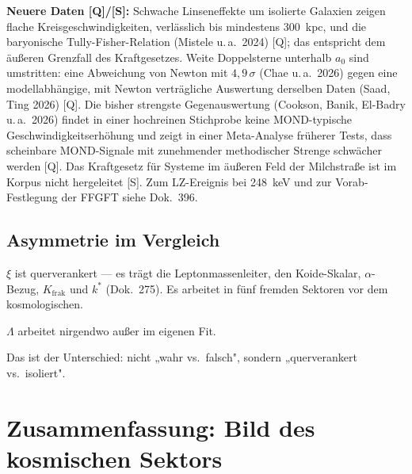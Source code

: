 \textbf{Neuere Daten [Q]/[S]:} Schwache Linseneffekte um isolierte Galaxien
zeigen flache Kreisgeschwindigkeiten, verlässlich bis mindestens 300~kpc,
und die baryonische Tully-Fisher-Relation (Mistele u.\,a.\ 2024) [Q]; das
entspricht dem äußeren Grenzfall des Kraftgesetzes. Weite Doppelsterne
unterhalb $a_0$ sind umstritten: eine Abweichung von Newton mit
$4{,}9\,\sigma$ (Chae u.\,a.\ 2026) gegen eine modellabhängige, mit Newton
verträgliche Auswertung derselben Daten (Saad, Ting 2026) [Q]. Die bisher
strengste Gegenauswertung (Cookson, Banik, El-Badry u.\,a.\ 2026) findet in
einer hochreinen Stichprobe keine MOND-typische Geschwindigkeitserhöhung und
zeigt in einer Meta-Analyse früherer Tests, dass scheinbare MOND-Signale mit
zunehmender methodischer Strenge schwächer werden [Q]. Das
Kraftgesetz für Systeme im äußeren Feld der Milchstraße ist im Korpus nicht
hergeleitet [S]. Zum LZ-Ereignis bei 248~keV und zur Vorab-Festlegung der
FFGFT siehe Dok.~396.

\section{Asymmetrie im Vergleich}

$\xi$ ist querverankert — es trägt die Leptonmassenleiter,
den Koide-Skalar, $\alpha$-Bezug, $K_\text{frak}$ und $k^*$ (Dok.~275).
Es arbeitet in fünf fremden Sektoren vor dem kosmologischen.

$\Lambda$ arbeitet nirgendwo außer im eigenen Fit.

Das ist der Unterschied: nicht „wahr vs.\ falsch", sondern
„querverankert vs.\ isoliert".

\chapter{Zusammenfassung: Bild des kosmischen Sektors}

